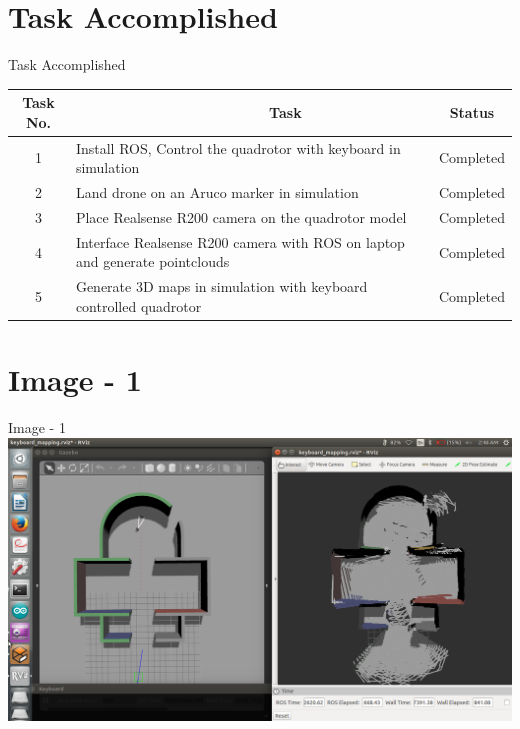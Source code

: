 \documentclass[10pt, a4paper]{beamer}
\begin{document}
\section{Task Accomplished}
\begin{frame}{Task Accomplished}
\begin{tabular}{| c | p{6.5cm} | c | }
\hline
Task No. & ~~~~~~~~~~~~~~~~~~~~~~~~Task & Status\\
\hline
  1 & Install ROS, Control the quadrotor with keyboard in simulation & Completed\\
\hline
2 & Land drone on an Aruco marker in simulation & Completed\\
\hline
3 & Place Realsense R200 camera on the quadrotor model & Completed\\
\hline
4 & Interface Realsense R200 camera with ROS on laptop and generate pointclouds & Completed\\
\hline
5 & Generate 3D maps in simulation with keyboard controlled quadrotor & Completed\\
\hline
\end{tabular}
\end{frame}

\section{Image - 1}
\begin{frame}{Image  - 1}
\includegraphics[scale = 0.2]{1.png}
\end{frame}
\end{document}
